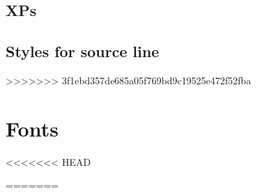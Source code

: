 \documentclass[output=book
	      ,nonflat
	      ,modfonts
	      ]{langsci/langscibook}
\begin{document}
\subsection{XPs}


  

 

\subsection{Styles for source line}




%  
% 
% 
>>>>>>> 3f1ebd357de685a05f769bd9c19525e472f52fba
\section{Fonts}



<<<<<<< HEAD
% 
% 
%  
%  

% 
% 
%  
%  
=======
\end{document}
